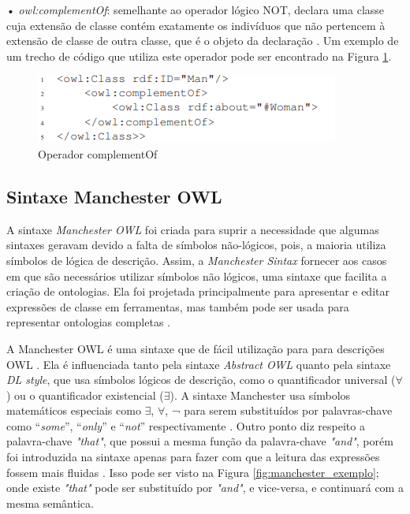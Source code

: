 \documentclass{bcc}
\begin{document}
• \textit{owl:complementOf}: semelhante ao operador lógico NOT,  declara uma classe cuja extensão de classe contém exatamente os indivíduos que não pertencem à extensão de classe de outra classe, que é o objeto da declaração \cite{bechhofer2004}. Um exemplo de um trecho de código que utiliza este operador pode ser encontrado na Figura \ref{fig:opnot}.

\begin{figure}[H]
\centering
\includegraphics[width=.9\textwidth]{Figuras/op_not.PNG}
\caption{Operador complementOf}
\label{fig:opnot}
\end{figure}


\subsection{Sintaxe Manchester OWL}

A sintaxe \textit{Manchester OWL} \cite{horridge2006} foi criada para suprir a necessidade que algumas sintaxes geravam devido a falta de símbolos não-lógicos, pois, a maioria utiliza símbolos de lógica de descrição. Assim, a \textit{Manchester Sintax} fornecer aos casos em que são necessários utilizar símbolos não lógicos, uma sintaxe que facilita a criação de ontologias. Ela foi projetada principalmente para apresentar e editar expressões de classe em ferramentas, mas também pode ser usada para representar ontologias completas \cite{horridge2006}.

A Manchester OWL é uma sintaxe que de fácil utilização para para descrições OWL \cite{horridge2009}. Ela é influenciada tanto pela sintaxe \textit{Abstract OWL} quanto pela sintaxe \textit{DL style}, que usa símbolos lógicos de descrição, como o quantificador universal ($\forall$) ou o quantificador existencial ($\exists$). A sintaxe  Manchester usa símbolos matemáticos especiais como $\exists$, $\forall$, ¬ para serem substituídos por palavras-chave como “\textit{some}”, “\textit{only}” e “\textit{not}” respectivamente \cite{yauri2012}. Outro ponto diz respeito a palavra-chave \textit{"that"}, que possui a mesma função da palavra-chave \textit{"and"}, porém foi introduzida na sintaxe apenas para fazer com que a leitura das expressões fossem mais fluidas \cite{horridge2006}. Isso pode ser visto na Figura \ref{fig:manchester_exemplo}; onde existe \textit{"that"} pode ser substituído por \textit{"and"}, e vice-versa, e continuará com a mesma semântica.
\end{document}
